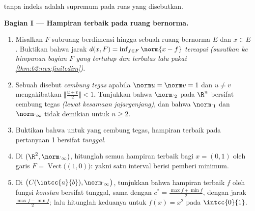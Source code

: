 \begin{problem}
\label{pb:b2:nvs:1}
 tanpa indeks adalah  supremum pada ruas yang disebutkan.

\medskip
\noindent\textbf{Bagian I --- Hampiran terbaik pada ruang
bernorma.}
\begin{enumerate}
  \item Misalkan $F$ subruang berdimensi hingga sebuah ruang
        bernorma $E$ dan $x \in E$. Buktikan bahwa jarak $d(x,
        F) = \inf_{f \in F}\norm{x - f}$ \emph{tercapai}
        \emph{(susutkan ke himpunan bagian $F$ yang tertutup dan terbatas
        lalu pakai \cref{thm:b2:nvs:finitedim})}.
  \item Sebuah  disebut \emph{cembung tegas} apabila $\norm u =
        \norm v = 1$ dan $u \neq v$ mengakibatkan $\bigl\Vert\frac{u +
        v}2\bigr\Vert < 1$. Tunjukkan bahwa $\norm\cdot_2$ pada $\R^n$
        bersifat cembung tegas \emph{(lewat kesamaan jajargenjang)}, dan
        bahwa $\norm\cdot_1$ dan $\norm\cdot_\infty$ tidak demikian untuk
        $n \geq 2$.
  \item Buktikan bahwa untuk  yang cembung tegas, hampiran
        terbaik pada pertanyaan 1 bersifat \emph{tunggal}.
  \item Di $(\R^2, \norm\cdot_\infty)$, hitunglah semua hampiran
        terbaik bagi $x = (0, 1)$ oleh garis $F =
        \operatorname{Vect}\bigl((1,0)\bigr)$: yakni satu interval
        berisi pemberi minimum.
  \item Di $\bigl(C(\intcc{a}{b}), \norm\cdot_\infty\bigr)$,
        tunjukkan bahwa hampiran terbaik $f$ oleh fungsi
        \emph{konstan} bersifat tunggal, sama dengan $c^* = \frac{\max f
        + \min f}{2}$, dengan jarak $\frac{\max f - \min
        f}{2}$; lalu hitunglah keduanya untuk $f(x) = x^2$ pada
        $\intcc{0}{1}$.
\end{enumerate}


\end{problem}
